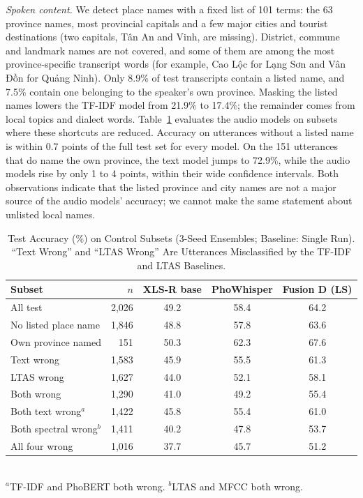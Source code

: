 \documentclass[conference]{IEEEtran}
\newcommand{\vn}[1]{\foreignlanguage{vietnamese}{#1}}
\begin{document}
\textit{Spoken content.} We detect place names with a fixed list of 101 terms: the 63 province names, most provincial capitals and a few major cities and tourist destinations (two capitals, Tân An and Vinh, are missing). District, commune and landmark names are not covered, and some of them are among the most province-specific transcript words (for example, \vn{Cao Lộc} for \vn{Lạng Sơn} and \vn{Vân Đồn} for \vn{Quảng Ninh}). Only 8.9\% of test transcripts contain a listed name, and 7.5\% contain one belonging to the speaker's own province. Masking the listed names lowers the TF-IDF model from 21.9\% to 17.4\%; the remainder comes from local topics and dialect words. Table~\ref{tab:subsets} evaluates the audio models on subsets where these shortcuts are reduced. Accuracy on utterances without a listed name is within 0.7 points of the full test set for every model. On the 151 utterances that do name the own province, the text model jumps to 72.9\%, while the audio models rise by only 1 to 4 points, within their wide confidence intervals. Both observations indicate that the listed province and city names are not a major source of the audio models' accuracy; we cannot make the same statement about unlisted local names.

\begin{table}[t]
\centering
\caption{Test Accuracy (\%) on Control Subsets (3-Seed Ensembles; Baseline: Single Run). ``Text Wrong'' and ``LTAS Wrong'' Are Utterances Misclassified by the TF-IDF and LTAS Baselines.}
\label{tab:subsets}
\setlength{\tabcolsep}{3.5pt}
\begin{tabular}{@{}lrccc@{}}
\toprule
Subset & $n$ & XLS-R base & PhoWhisper & Fusion D (LS) \\
\midrule
All test & 2,026 & 49.2 & 58.4 & 64.2 \\
No listed place name & 1,846 & 48.8 & 57.8 & 63.6 \\
Own province named & 151 & 50.3 & 62.3 & 67.6 \\
Text wrong & 1,583 & 45.9 & 55.5 & 61.3 \\
LTAS wrong & 1,627 & 44.0 & 52.1 & 58.1 \\
Both wrong & 1,290 & 41.0 & 49.2 & 55.4 \\
\midrule
Both text wrong$^{a}$ & 1,422 & 45.8 & 55.4 & 61.0 \\
Both spectral wrong$^{b}$ & 1,411 & 40.2 & 47.8 & 53.7 \\
All four wrong & 1,016 & 37.7 & 45.7 & 51.2 \\
\bottomrule
\end{tabular}\\[2pt]
{\footnotesize $^{a}$TF-IDF and PhoBERT both wrong. $^{b}$LTAS and MFCC both wrong.}
\end{table}
\end{document}
